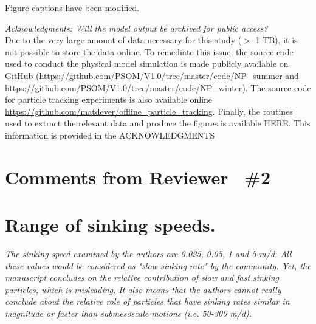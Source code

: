 \documentclass[12pt,letter]{article}
\begin{document}
{\color{blue}Figure captions have been modified.\\}

\textit{Acknowledgments: Will the model output be archived for public access?}\\
{\color{red}Due to the very large amount of data necessary for this study ($>$ 1 TB), it is not possible to store the data online. To remediate this issue, the source code used to conduct the physical model simulation is made publicly available on GitHub (\url{https://github.com/PSOM/V1.0/tree/master/code/NP_summer} and \url{https://github.com/PSOM/V1.0/tree/master/code/NP_winter}).
	The source code for particle tracking experiments is also available online \url{https://github.com/matdever/offline_particle_tracking}. Finally, the routines used to extract the relevant data and produce the figures is available HERE. This information is provided in the ACKNOWLEDGMENTS}

\section{Comments from Reviewer  \#2}

\section*{Range of sinking speeds.}
\textit{The sinking speed examined by the authors are 0.025, 0.05, 1 and 5 m/d. All these values would be considered as "slow sinking rate" by the community. Yet, the manuscript concludes on the relative contribution of slow and fast sinking particles, which is misleading. It also means that the authors cannot really conclude about the relative role of particles that have sinking rates similar in magnitude or faster than submesoscale motions (i.e. 50-300 m/d).}
\end{document}
